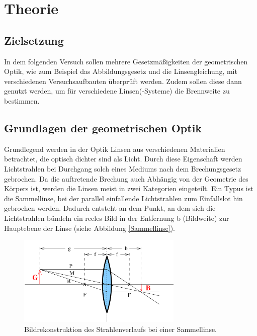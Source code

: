 



\section{Theorie}

\subsection{Zielsetzung}

In dem folgenden Versuch sollen mehrere Gesetzmäßigkeiten der geometrischen Optik,
wie zum Beispiel das Abbildungsgesetz und die Linsengleichung, mit verschiedenen
Versuchsaufbauten überprüft werden. Zudem sollen diese dann genutzt werden, um
für verschiedene Linsen(-Systeme) die Brennweite zu bestimmen.

\subsection{Grundlagen der geometrischen Optik}

Grundlegend werden in der Optik Linsen aus verschiedenen Materialien betrachtet,
die optisch dichter sind als Licht. Durch diese Eigenschaft werden Lichtstrahlen
bei Durchgang solch eines Mediums nach dem Brechungsgesetz gebrochen. Da die
auftretende Brechung auch Abhängig von der Geometrie des Körpers ist, werden
die Linsen meist in zwei Kategorien eingeteilt. Ein Typus ist die Sammellinse, bei
der parallel einfallende Lichtstrahlen zum Einfallslot hin gebrochen werden.
Dadurch entsteht an dem Punkt, an dem sich die Lichtstrahlen bündeln ein reeles
Bild in der Entfernung b (Bildweite) zur Hauptebene der Linse (siehe Abbildung
\ref{Sammellinse}).

\begin{figure}
  \centering
  \includegraphics[width = 0.7\textwidth]{Sammellinse.png}
  \caption{Bildrekonstruktion des Strahlenverlaufs bei einer Sammellinse.\cite{anleitung01}}
  \label{fig:Sammellinse}
\end{figure}


